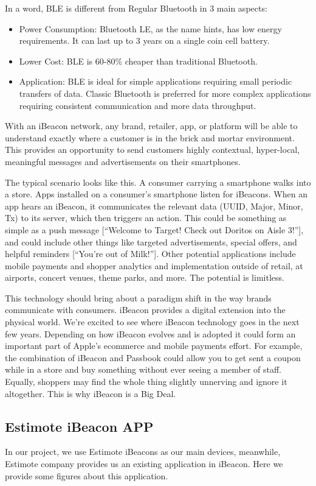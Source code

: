 \documentclass[12pt]{report}
\begin{document}
In a word, BLE is different from Regular Bluetooth in 3 main aspects:

\begin{itemize}
\item Power Consumption: Bluetooth LE, as the name hints, has low energy requirements. It can last up to 3 years on a single coin cell battery.
\item Lower Cost: BLE is 60-80\% cheaper than traditional Bluetooth.
\item Application: BLE is ideal for simple applications requiring small periodic transfers of data. Classic Bluetooth is preferred for more complex applications requiring consistent communication and more data throughput.
\end{itemize}

With an iBeacon network, any brand, retailer, app, or platform will be able to understand exactly where a customer is in the brick and mortar environment. This provides an opportunity to send customers highly contextual, hyper-local, meaningful messages and advertisements on their smartphones.

The typical scenario looks like this. A consumer carrying a smartphone walks into a store. Apps installed on a consumer’s smartphone listen for iBeacons. When an app hears an iBeacon, it communicates the relevant data (UUID, Major, Minor, Tx) to its server, which then triggers an action. This could be something as simple as a push message [“Welcome to Target! Check out Doritos on Aisle 3!”], and could include other things like targeted advertisements, special offers, and helpful reminders [“You’re out of Milk!”]. Other potential applications include mobile payments and shopper analytics and implementation outside of retail, at airports, concert venues, theme parks, and more. The potential is limitless.

This technology should bring about a paradigm shift in the way brands communicate with consumers. iBeacon provides a digital extension into the physical world. We’re excited to see where iBeacon technology goes in the next few years. Depending on how iBeacon evolves and is adopted it could form an important part of Apple's ecommerce and mobile payments effort. For example, the combination of iBeacon and Passbook could allow you to get sent a coupon while in a store and buy something without ever seeing a member of staff. Equally, shoppers may find the whole thing slightly unnerving and ignore it altogether. This is why iBeacon is a Big Deal.

\subsection{Estimote iBeacon APP}
In our project, we use Estimote iBeacons as our main devices, meanwhile, Estimote company provides us an existing application in iBeacon. Here we provide some figures about this application.
\end{document}

